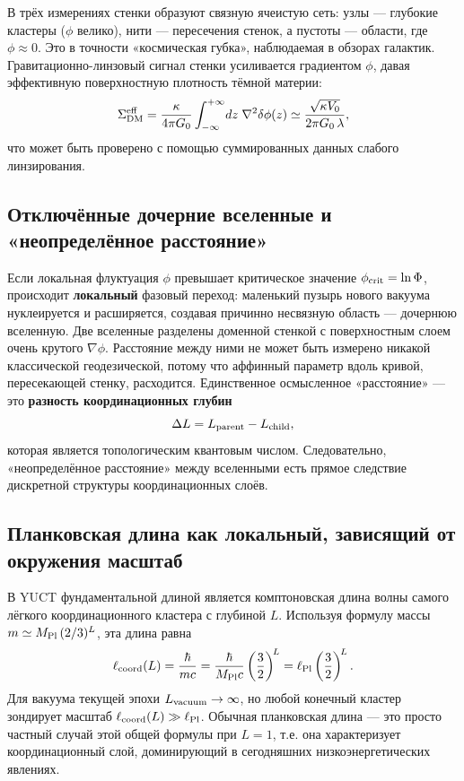 \documentclass[12pt,a4paper]{article}
\begin{document}
	В трёх измерениях стенки образуют связную ячеистую сеть: узлы — глубокие кластеры (\(\phi\) велико), нити — пересечения стенок, а пустоты — области, где \(\phi \approx 0\). Это в точности «космическая губка», наблюдаемая в обзорах галактик. Гравитационно-линзовый сигнал стенки усиливается градиентом \(\phi\), давая эффективную поверхностную плотность тёмной материи:
	\begin{equation}
		\Sigma_{\rm DM}^{\rm eff} = \frac{\kappa}{4\pi G_0} \int_{-\infty}^{+\infty} \!dz\; \nabla^2\delta\phi(z)
		\simeq \frac{\sqrt{\kappa V_0}}{2\pi G_0\,\lambda},
		\label{eq:wall-lensing}
	\end{equation}
	что может быть проверено с помощью суммированных данных слабого линзирования.
	
	\subsection{Отключённые дочерние вселенные и «неопределённое расстояние»}
	Если локальная флуктуация \(\phi\) превышает критическое значение \(\phi_{\rm crit}=\ln\Phi\), происходит \textbf{локальный} фазовый переход: маленький пузырь нового вакуума нуклеируется и расширяется, создавая причинно несвязную область — дочернюю вселенную. Две вселенные разделены доменной стенкой с поверхностным слоем очень крутого \(\nabla\phi\). Расстояние между ними не может быть измерено никакой классической геодезической, потому что аффинный параметр вдоль кривой, пересекающей стенку, расходится. Единственное осмысленное «расстояние» — это \textbf{разность координационных глубин}
	\begin{equation}
		\Delta L = L_{\rm parent} - L_{\rm child},
		\label{eq:deltaL}
	\end{equation}
	которая является топологическим квантовым числом. Следовательно, «неопределённое расстояние» между вселенными есть прямое следствие дискретной структуры координационных слоёв.
	
	\subsection{Планковская длина как локальный, зависящий от окружения масштаб}
	В YUCT фундаментальной длиной является комптоновская длина волны самого лёгкого координационного кластера с глубиной \(L\). Используя формулу массы \(m \simeq M_{\rm Pl}\,(2/3)^L\), эта длина равна
	\begin{equation}
		\ell_{\rm coord}(L) = \frac{\hbar}{m c}
		= \frac{\hbar}{M_{\rm Pl}c} \left(\frac{3}{2}\right)^{\!L}
		= \ell_{\rm Pl} \left(\frac{3}{2}\right)^{\!L}.
		\label{eq:length-from-L}
	\end{equation}
	Для вакуума текущей эпохи \(L_{\rm vacuum}\to\infty\), но любой конечный кластер зондирует масштаб \(\ell_{\rm coord}(L) \gg \ell_{\rm Pl}\). Обычная планковская длина — это просто частный случай этой общей формулы при \(L=1\), т.е. она характеризует координационный слой, доминирующий в сегодняшних низкоэнергетических явлениях.
	
\end{document}
